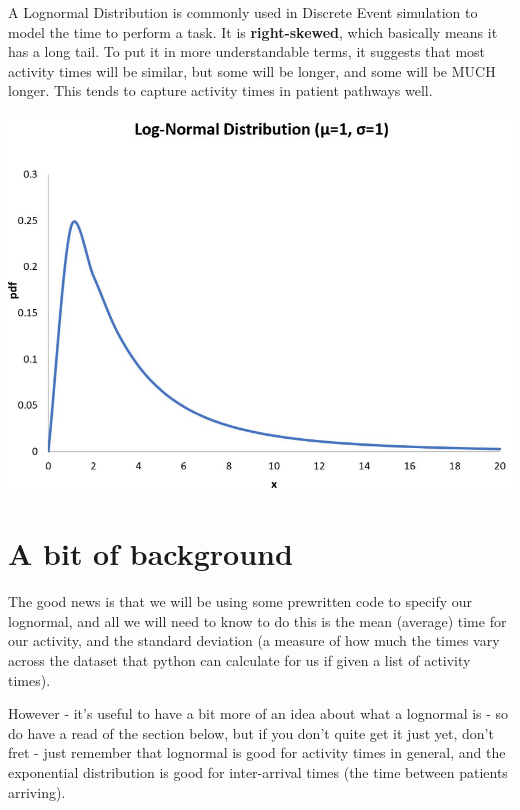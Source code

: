 \documentclass[
  letterpaper,
  DIV=11,
  numbers=noendperiod]{scrreprt}
\begin{document}
A Lognormal Distribution is commonly used in Discrete Event simulation
to model the time to perform a task. It is \textbf{right-skewed}, which
basically means it has a long tail. To put it in more understandable
terms, it suggests that most activity times will be similar, but some
will be longer, and some will be MUCH longer. This tends to capture
activity times in patient pathways well.

\includegraphics{images/lognormal.png}

\section{A bit of background}\label{a-bit-of-background}

\begin{tcolorbox}[enhanced jigsaw, rightrule=.15mm, colback=white, colframe=quarto-callout-tip-color-frame, colbacktitle=quarto-callout-tip-color!10!white, toprule=.15mm, coltitle=black, opacityback=0, titlerule=0mm, bottomtitle=1mm, breakable, title=\textcolor{quarto-callout-tip-color}{\faLightbulb}\hspace{0.5em}{Tip}, opacitybacktitle=0.6, toptitle=1mm, arc=.35mm, bottomrule=.15mm, leftrule=.75mm, left=2mm]

The good news is that we will be using some prewritten code to specify
our lognormal, and all we will need to know to do this is the mean
(average) time for our activity, and the standard deviation (a measure
of how much the times vary across the dataset that python can calculate
for us if given a list of activity times).

However - it's useful to have a bit more of an idea about what a
lognormal is - so do have a read of the section below, but if you don't
quite get it just yet, don't fret - just remember that lognormal is good
for activity times in general, and the exponential distribution is good
for inter-arrival times (the time between patients arriving).

\end{tcolorbox}
\end{document}
